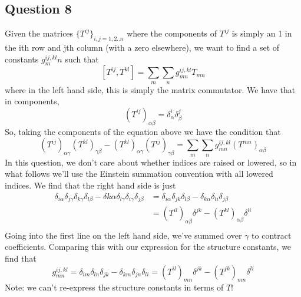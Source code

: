 \subsection{Question 8} 
Given the matrices $\{T^{ij} \}_{ i, j = 1, 2 .. n}$ where the components of $T^{ij}$ is simply an 1 in the ith row and jth column (with a zero elsewhere), we want to find a set of constants $g^{ ij, kl }_mn$ such that 
\[ 
	[ T^{ij}, T^{kl} ] = \sum_m \sum_n g^{ ij, kl}_{mn} T_{mn} 
\] 
where in the left hand side, this is simply the matrix commutator. We have that in components, 
\[ 
 	(T^{ij})_{\alpha \beta} = \delta^i_\alpha \delta^j_\beta
\] 
So, taking the components of the equation above we have the condition that 
\[ 
	(T^{ij})_{\alpha\gamma} (T^{kl})_{\gamma \beta}  - (T^{kl})_{\alpha \gamma} (T^{ij})_{\gamma \beta} = \sum_m \sum_n g^{ij, kl}_{mn} (T^{mn})_{\alpha \beta} \]
In this question, we don't care about whether indices are raised or lowered, so in what follows we'll use the Einstein summation convention with all lowered indices. We find that the right hand side is just
\begin{align*} 
	\delta_{i \alpha} \delta_{j \gamma} \delta_{k \gamma} \delta_{ l \beta}  - \delta{k \alpha} \delta_{ l \gamma} \delta_{i \gamma } \delta_{j \beta} & = \delta_{i \alpha} \delta_{j k} \delta_{ l \beta}  - \delta_{ k \alpha} \delta_{ li } \delta_{ j \beta} \\
	&= (T^{ il} )_{\alpha \beta} \delta^{ j k}  - (T^{ kl})_{\alpha \beta} \delta^{li} \\
\end{align*} 
Going into the first line on the left hand side, we've summed over $\gamma$ to contract coefficients. Comparing this with our expression for the structure constants, we find that 
\[ 
 g^{ ij, kl}_{ mn} = \delta_{ im} \delta_{ ln} \delta_{jk}  - \delta_{km}\delta_{jn}\delta_{ li}  = (T^{il})_{mn} \delta^{jk}  - (T^{jk})_{mn} \delta^{li} 
\] 
Note: we can't re-express the structure constants in terms of $ T $!  
\pagebreak 

